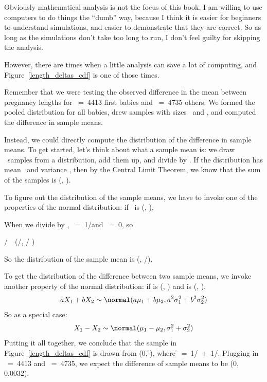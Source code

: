 \documentclass[12pt]{book}
\begin{document}
Obviously mathematical analysis is not the focus of this book.  I am
willing to use computers to do things the ``dumb'' way, because I
think it is easier for beginners to understand simulations, and easier
to demonstrate that they are correct.  So as long as the simulations
don't take too long to run, I don't feel guilty for skipping the
analysis.

However, there are times when a little analysis can save a lot of
computing, and Figure~\ref{length_deltas_cdf} is one of those times.

Remember that we were testing the observed difference in the mean between
pregnancy lengths for \n~=~4413 first babies and \m~=~4735 others.  We formed
the pooled distribution for all babies, drew samples with sizes \n~and
\m, and computed the difference in sample means.

Instead, we could directly compute the distribution of the difference
in sample means.  To get started, let's think about what a sample mean
is: we draw \n~samples from a distribution, add them up, and
divide by \n.  If the distribution has mean \mymu~and variance
\sigmasq, then by the Central Limit Theorem, we know that the sum of
the samples is \mynormal (\n \mymu, \n \sigmasq).

To figure out the distribution of the sample means, we have to invoke
one of the properties of the normal distribution: if \X~is
\mynormal (\mymu, \sigmasq),


When we divide by \n, \mya~=~1/\n and \myb~=~0, so

\X/\n~\mysim~\mynormal(\mymu /\n, \sigmasq/ \n{})

So the distribution of the sample mean is \mynormal (\mymu, \sigmasq/\n).

To get the distribution of the difference between two sample means,
we invoke another property of the normal distribution: if \X{} is
\mynormal (\mymu{}, \mysigma{}) and \X{} is
\mynormal (\mymu{}, \mysigma{}),
%
\[ aX_1 + bX_2 \sim \normal(a\mu_1 + b\mu_2, 
                                 a^2\sigma_1^2 + b^2\sigma_2^2) \]
%
So as a special case:
%
\[ X_1 - X_2 \sim \normal(\mu_1 - \mu_2, 
                               \sigma_1^2 + \sigma_2^2) \]
%
Putting it all together, we conclude that the sample in
Figure~\ref{length_deltas_cdf} is drawn from 
\mynormal (0, \f \sigmasq), where \f~=~1/\n~+~1/\m.  Plugging in
\n~=~4413 and \m~=~4735, we expect the difference of sample means to be
\mynormal (0, 0.0032).
\end{document}
